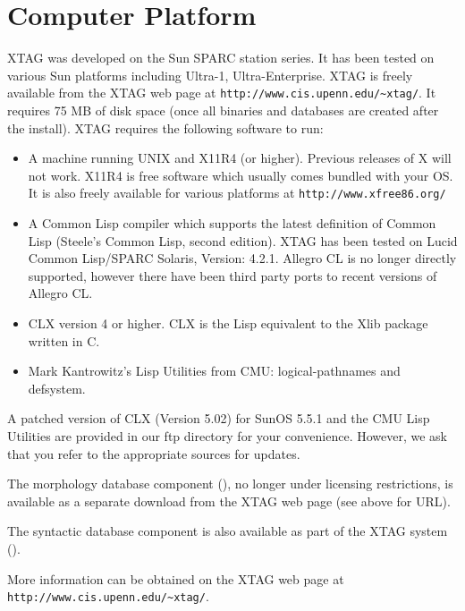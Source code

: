 \section{Computer Platform} 
 
 
XTAG was developed on the Sun SPARC station series. It has been tested 
on various Sun platforms including Ultra-1, Ultra-Enterprise. XTAG is 
freely available from the XTAG web page at {\tt   http://www.cis.upenn.edu/\~{}xtag/}. It requires 75 MB of disk space 
(once all binaries and databases are created after the install). XTAG 
requires the following software to run: 
 
\begin{itemize} 
  
\item A machine running UNIX and X11R4 (or higher). Previous releases 
  of X will not work. X11R4 is free software which usually comes 
  bundled with your OS. It is also freely available for various 
  platforms at {\tt http://www.xfree86.org/} 
  
\item A Common Lisp compiler which supports the latest definition of 
  Common Lisp (Steele's Common Lisp, second edition). XTAG has been 
  tested on Lucid Common Lisp/SPARC Solaris, Version: 4.2.1. Allegro 
  CL is no longer directly supported, however there have been third 
  party ports to recent versions of Allegro CL. 
  
\item CLX version 4 or higher. CLX is the Lisp equivalent to the Xlib 
  package written in C. 
  
\item Mark Kantrowitz's Lisp Utilities from CMU: logical-pathnames and 
  defsystem. 
 
\end{itemize} 
 
A patched version of CLX (Version 5.02) for SunOS 5.5.1 and the CMU 
Lisp Utilities are provided in our ftp directory for your convenience. 
However, we ask that you refer to the appropriate sources for updates. 
 
The morphology database component (\cite{karp92}), no longer under 
licensing restrictions, is available as a separate download from the 
XTAG web page (see above for URL). 
 
The syntactic database component is also available as part of the XTAG 
system (\cite{EgediMartin94}). 
 
More information can be obtained on the XTAG web page at \\ 
{\tt http://www.cis.upenn.edu/\~{}xtag/}. 
 
